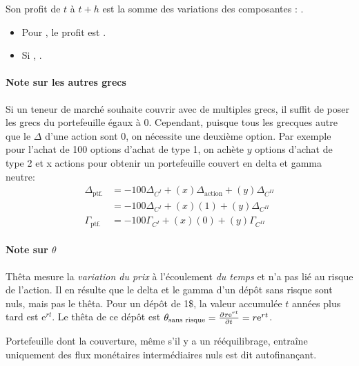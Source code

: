 \documentclass[10pt, french]{article}
\begin{document}
\begin{multicols*}{2}
Son profit de $t$ à $t + h$ est la somme des variations des composantes : .
\begin{itemize}
	\item	Pour , le profit est .
	\item	Si , .
\end{itemize}

\paragraph{Note sur les autres grecs}	Si un teneur de marché souhaite couvrir avec de multiples grecs, il suffit de poser les grecs du portefeuille égaux à 0. Cependant, puisque tous les grecques autre que le $\Delta$ d'une action sont 0, on nécessite une deuxième option. Par exemple pour l'achat de 100 options d'achat de type 1, on achète $y$ options d'achat de type 2 et x actions pour obtenir un portefeuille couvert en delta et gamma neutre:
\begin{align*}
	\Delta_{\text{ptf.}}
	&=	-100 \Delta_{C^{I}} + (x)\Delta_{\text{action}} + (y)\Delta_{C^{II}}	\\
	&=	-100 \Delta_{C^{I}} + (x)(1) + (y)\Delta_{C^{II}}	\\
	\Gamma_{\text{ptf.}}
	&=	-100 \Gamma_{C^{I}} + (x)(0) + (y)\Gamma_{C^{II}}	
\end{align*}

\paragraph{Note sur $\theta$} Thêta mesure la \textit{variation du prix} à l'écoulement \textit{du temps} et n'a pas lié au risque de l'action. Il en résulte que le delta et le gamma d'un dépôt sans risque sont nuls, mais pas le thêta. Pour un dépôt de 1\$, la valeur accumulée $t$ années plus tard est $\textrm{e}^{rt}$. Le thêta de ce dépôt est $\theta_{\text{sans risque}}	=	\deriv{t}{r\textrm{e}^{rt}}	=	r\textrm{e}^{rt}$. 

\begin{definitionNOHFILL}[Autofinançant]
Portefeuille dont la couverture, même s'il y a un rééquilibrage, entraîne uniquement des flux monétaires intermédiaires nuls est dit autofinançant. 
\end{definitionNOHFILL}



\end{multicols*}
\end{document}
